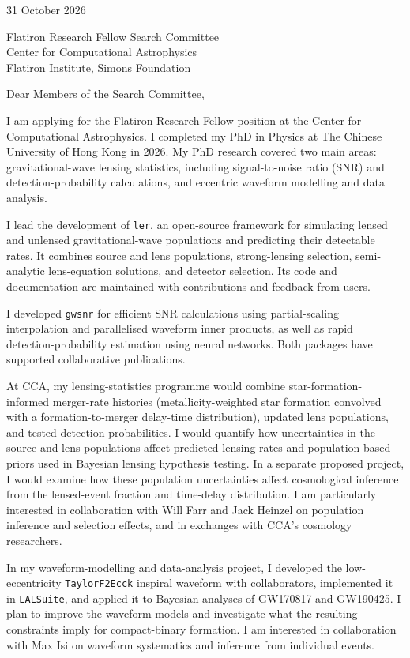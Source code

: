 \documentclass[11pt]{article}
\begin{document}

31 October 2026

Flatiron Research Fellow Search Committee\\
Center for Computational Astrophysics\\
Flatiron Institute, Simons Foundation

Dear Members of the Search Committee,

I am applying for the Flatiron Research Fellow position at the Center for Computational Astrophysics. I completed my PhD in Physics at The Chinese University of Hong Kong in 2026. My PhD research covered two main areas: gravitational-wave lensing statistics, including signal-to-noise ratio (SNR) and detection-probability calculations, and eccentric waveform modelling and data analysis.

I lead the development of \texttt{ler}, an open-source framework for simulating lensed and unlensed gravitational-wave populations and predicting their detectable rates. It combines source and lens populations, strong-lensing selection, semi-analytic lens-equation solutions, and detector selection. Its code and documentation are maintained with contributions and feedback from users.

I developed \texttt{gwsnr} for efficient SNR calculations using partial-scaling interpolation and parallelised waveform inner products, as well as rapid detection-probability estimation using neural networks. Both packages have supported collaborative publications.

At CCA, my lensing-statistics programme would combine star-formation-informed merger-rate histories (metallicity-weighted star formation convolved with a formation-to-merger delay-time distribution), updated lens populations, and tested detection probabilities. I would quantify how uncertainties in the source and lens populations affect predicted lensing rates and population-based priors used in Bayesian lensing hypothesis testing. In a separate proposed project, I would examine how these population uncertainties affect cosmological inference from the lensed-event fraction and time-delay distribution. I am particularly interested in collaboration with Will Farr and Jack Heinzel on population inference and selection effects, and in exchanges with CCA's cosmology researchers.

In my waveform-modelling and data-analysis project, I developed the low-eccentricity \texttt{TaylorF2Ecck} inspiral waveform with collaborators, implemented it in \texttt{LALSuite}, and applied it to Bayesian analyses of GW170817 and GW190425. I plan to improve the waveform models and investigate what the resulting constraints imply for compact-binary formation. I am interested in collaboration with Max Isi on waveform systematics and inference from individual events.
\end{document}

